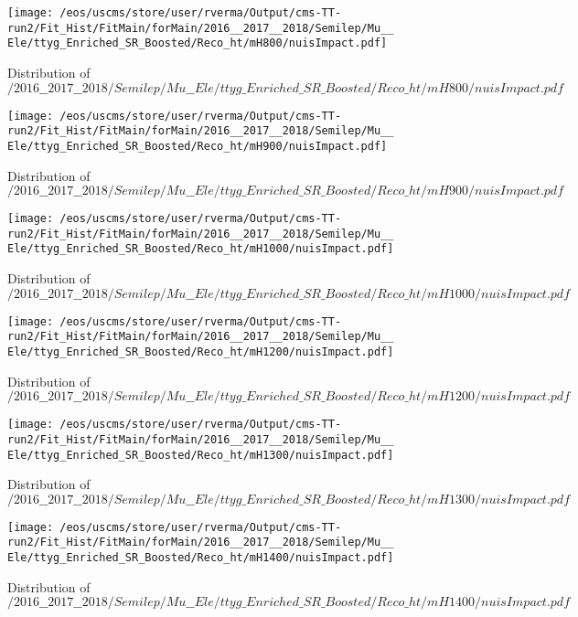 \begin{figure}
\centering
\texttt{[image: /eos/uscms/store/user/rverma/Output/cms-TT-run2/Fit\_Hist/FitMain/forMain/2016\_\_2017\_\_2018/Semilep/Mu\_\_Ele/ttyg\_Enriched\_SR\_Boosted/Reco\_ht/mH800/nuisImpact.pdf]}
\caption{Distribution of $/2016\_\_2017\_\_2018/Semilep/Mu\_\_Ele/ttyg\_Enriched\_SR\_Boosted/Reco\_ht/mH800/nuisImpact.pdf$}
\end{figure}

\begin{figure}
\centering
\texttt{[image: /eos/uscms/store/user/rverma/Output/cms-TT-run2/Fit\_Hist/FitMain/forMain/2016\_\_2017\_\_2018/Semilep/Mu\_\_Ele/ttyg\_Enriched\_SR\_Boosted/Reco\_ht/mH900/nuisImpact.pdf]}
\caption{Distribution of $/2016\_\_2017\_\_2018/Semilep/Mu\_\_Ele/ttyg\_Enriched\_SR\_Boosted/Reco\_ht/mH900/nuisImpact.pdf$}
\end{figure}

\begin{figure}
\centering
\texttt{[image: /eos/uscms/store/user/rverma/Output/cms-TT-run2/Fit\_Hist/FitMain/forMain/2016\_\_2017\_\_2018/Semilep/Mu\_\_Ele/ttyg\_Enriched\_SR\_Boosted/Reco\_ht/mH1000/nuisImpact.pdf]}
\caption{Distribution of $/2016\_\_2017\_\_2018/Semilep/Mu\_\_Ele/ttyg\_Enriched\_SR\_Boosted/Reco\_ht/mH1000/nuisImpact.pdf$}
\end{figure}

\begin{figure}
\centering
\texttt{[image: /eos/uscms/store/user/rverma/Output/cms-TT-run2/Fit\_Hist/FitMain/forMain/2016\_\_2017\_\_2018/Semilep/Mu\_\_Ele/ttyg\_Enriched\_SR\_Boosted/Reco\_ht/mH1200/nuisImpact.pdf]}
\caption{Distribution of $/2016\_\_2017\_\_2018/Semilep/Mu\_\_Ele/ttyg\_Enriched\_SR\_Boosted/Reco\_ht/mH1200/nuisImpact.pdf$}
\end{figure}

\begin{figure}
\centering
\texttt{[image: /eos/uscms/store/user/rverma/Output/cms-TT-run2/Fit\_Hist/FitMain/forMain/2016\_\_2017\_\_2018/Semilep/Mu\_\_Ele/ttyg\_Enriched\_SR\_Boosted/Reco\_ht/mH1300/nuisImpact.pdf]}
\caption{Distribution of $/2016\_\_2017\_\_2018/Semilep/Mu\_\_Ele/ttyg\_Enriched\_SR\_Boosted/Reco\_ht/mH1300/nuisImpact.pdf$}
\end{figure}

\begin{figure}
\centering
\texttt{[image: /eos/uscms/store/user/rverma/Output/cms-TT-run2/Fit\_Hist/FitMain/forMain/2016\_\_2017\_\_2018/Semilep/Mu\_\_Ele/ttyg\_Enriched\_SR\_Boosted/Reco\_ht/mH1400/nuisImpact.pdf]}
\caption{Distribution of $/2016\_\_2017\_\_2018/Semilep/Mu\_\_Ele/ttyg\_Enriched\_SR\_Boosted/Reco\_ht/mH1400/nuisImpact.pdf$}
\end{figure}


